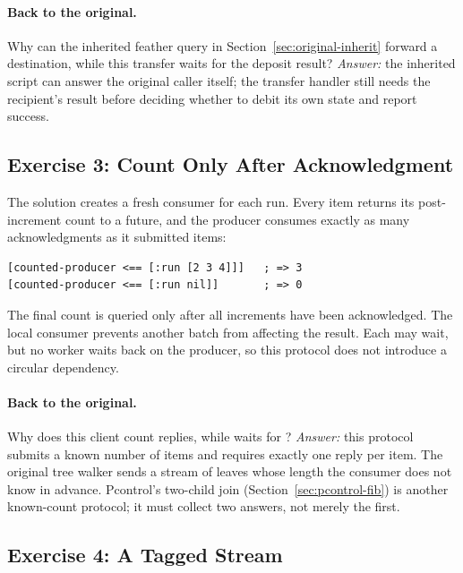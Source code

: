 \paragraph{Back to the original.}
Why can the inherited feather query in Section~\ref{sec:original-inherit}
forward a destination, while this transfer waits for the deposit result?
\emph{Answer:} the inherited script can answer the original caller itself;
the transfer handler still needs the recipient's result before deciding
whether to debit its own state and report success.

\subsection{Exercise 3: Count Only After Acknowledgment}
\label{sol:count}

The solution creates a fresh consumer for each run. Every item returns
its post-increment count to a future, and the producer consumes exactly
as many acknowledgments as it submitted items:


\begin{lstlisting}
[counted-producer <== [:run [2 3 4]]]   ; => 3
[counted-producer <== [:run nil]]       ; => 0
\end{lstlisting}

The final count is queried only after all increments have been acknowledged.
The local consumer prevents another batch from affecting the result.
Each  may wait, but no worker waits back on the producer,
so this protocol does not introduce a circular dependency.

\paragraph{Back to the original.}
Why does this client count replies, while  waits for
? \emph{Answer:} this protocol submits a known number of
items and requires exactly one reply per item. The original tree walker
sends a stream of leaves whose length the consumer does not know in advance.
Pcontrol's two-child join (Section~\ref{sec:pcontrol-fib}) is another
known-count protocol; it must collect two answers, not merely the first.

\subsection{Exercise 4: A Tagged Stream}
\label{sol:stream}

